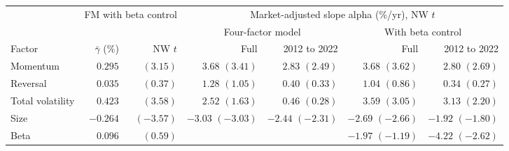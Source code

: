 \begin{tabular}{lrrrrrr}
\toprule
& \multicolumn{2}{c}{FM with beta control} & \multicolumn{4}{c}{Market-adjusted slope alpha (\%/yr), NW $t$} \\
\cmidrule(lr){2-3} \cmidrule(lr){4-7}
& & & \multicolumn{2}{c}{Four-factor model} & \multicolumn{2}{c}{With beta control} \\
\cmidrule(lr){4-5} \cmidrule(lr){6-7}
Factor & $\bar\gamma$ (\%) & NW $t$ & Full & 2012 to 2022 & Full & 2012 to 2022 \\
\midrule
Momentum & $0.295$ & $(3.15)$ & $3.68$ $(3.41)$ & $2.83$ $(2.49)$ & $3.68$ $(3.62)$ & $2.80$ $(2.69)$ \\
Reversal & $0.035$ & $(0.37)$ & $1.28$ $(1.05)$ & $0.40$ $(0.33)$ & $1.04$ $(0.86)$ & $0.34$ $(0.27)$ \\
Total volatility & $0.423$ & $(3.58)$ & $2.52$ $(1.63)$ & $0.46$ $(0.28)$ & $3.59$ $(3.05)$ & $3.13$ $(2.20)$ \\
Size & $-0.264$ & $(-3.57)$ & $-3.03$ $(-3.03)$ & $-2.44$ $(-2.31)$ & $-2.69$ $(-2.66)$ & $-1.92$ $(-1.80)$ \\
Beta & $0.096$ & $(0.59)$ &  &  & $-1.97$ $(-1.19)$ & $-4.22$ $(-2.62)$ \\
\bottomrule
\end{tabular}
